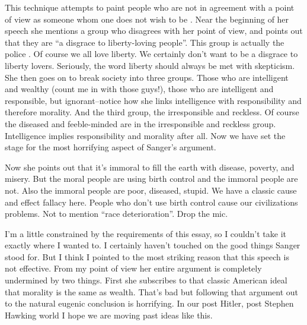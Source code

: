 \documentclass[letterpaper,12pt]{article}
\begin{document}
This technique attempts to paint people who are not in agreement with a point of view as someone whom one does not wish to be \cite{text}. Near the beginning of her speech she mentions a group who disagrees with her point of view, and points out that they are ``a disgrace to liberty-loving people''. This group  is actually the police \cite{origin}. Of course we all love liberty. We certainly don't want to be a disgrace to liberty lovers. Seriously, the word liberty should always be met with skepticism. She then goes on to break society into three groups. Those who are intelligent and wealthy (count me in with those guys!), those who are intelligent and responsible, but ignorant--notice how she links intelligence with responsibility and therefore morality. And the third group, the irresponsible and reckless. Of course the diseased and feeble-minded are in the irresponsible and reckless group. Intelligence implies responsibility and morality after all. Now we have set the stage for the most horrifying aspect of Sanger's argument.

Now she points out that it's immoral to fill the earth with disease, poverty, and misery. But the moral people are using birth control and the immoral people are not. Also the immoral people are poor, diseased, stupid. We have a classic cause and effect fallacy here. People who don't use birth control cause our civilizations problems. Not to mention ``race deterioration''. Drop the mic.

I'm a little constrained by the requirements of this essay, so I couldn't take it exactly where I wanted to. I certainly haven't touched on the good things Sanger stood for. But I think I pointed to the most striking reason that this speech is not effective. From my point of view her entire argument is completely undermined by two things. First she subscribes to that classic American ideal that morality is the same as wealth. That's bad but following that argument out to the natural eugenic conclusion is horrifying. In our post Hitler, post Stephen Hawking world I hope we are moving past ideas like this.
\newpage
\begingroup


\endgroup
\end{document}
